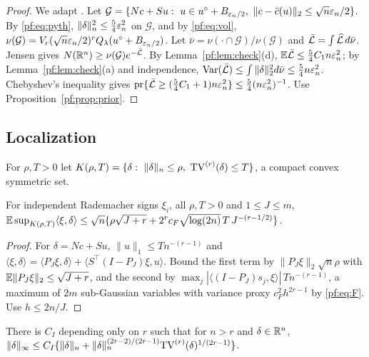 \begin{proof}
We adapt \citet[Lemma~8.1]{ghosal2000convergence}. Let $\mathcal G=\{Nc+Su:\ u\in u^\circ+B_{\en/2},\ \|c-\bar c(u)\|_2\le\sqrt n\en/2\}$. By \eqref{pf:eq:pyth}, $\|\delta\|_n^2\le\tfrac54\varepsilon_n^2$ on $\mathcal G$, and by \eqref{pf:eq:vol}, $\nu(\mathcal G)=V_r(\sqrt n\varepsilon_n/2)^rQ_\lambda(u^\circ+B_{\varepsilon_n/2})$. Let $\bar\nu=\nu(\cdot\cap\mathcal G)/\nu(\mathcal G)$ and $\bar{\mathcal L}=\int\widehat{\mathcal L}\,d\bar\nu$. Jensen gives $N(\mathbb{R}^n)\ge\nu(\mathcal G)e^{-\bar{\mathcal L}}$. By Lemma~\ref{pf:lem:check}(d), $\mathbb{E}\bar{\mathcal L}\le\tfrac54C_1n\varepsilon_n^2$; by Lemma~\ref{pf:lem:check}(a) and independence, $\mathrm{Var}(\bar{\mathcal L})\le\int\|\delta\|_2^2d\bar\nu\le\tfrac54n\varepsilon_n^2$. Chebyshev's inequality gives $\mathrm{pr}\{\bar{\mathcal L}\ge(\tfrac54C_1+1)n\varepsilon_n^2\}\le\tfrac54(n\varepsilon_n^2)^{-1}$. Use Proposition~\ref{pf:prop:prior}.
\end{proof}

\subsection{Localization}

For $\rho,T>0$ let $K(\rho,T)=\{\delta:\ \nn{\delta}\le\rho,\ \TV^{(r)}(\delta)\le T\}$, a compact convex symmetric set.

\begin{lemma}[width]\label{pf:lem:width}
For independent Rademacher signs $\xi_i$, all $\rho,T>0$ and $1\le J\le m$,
$\mathbb{E}\sup_{K(\rho,T)}\langle\xi,\delta\rangle\le\sqrt n\{\rho\sqrt{J+r}+2^rc_F\sqrt{\log(2n)}\,T\,J^{-(r-1/2)}\}$.
\end{lemma}

\begin{proof}
For $\delta=Nc+Su$, $\|u\|_1\le Tn^{-(r-1)}$ and $\langle\xi,\delta\rangle=\langle P_J\xi,\delta\rangle+\langle S^\top(I-P_J)\xi,u\rangle$. Bound the first term by $\|P_J\xi\|_2\sqrt n\rho$ with $\mathbb{E}\|P_J\xi\|_2\le\sqrt{J+r}$, and the second by $\max_j|\langle(I-P_J)s_j,\xi\rangle|\,Tn^{-(r-1)}$, a maximum of $2m$ sub-Gaussian variables with variance proxy $c_F^2h^{2r-1}$ by \eqref{pf:eq:F}. Use $h\le2n/J$.
\end{proof}

\begin{lemma}[interpolation]\label{pf:lem:interp}
There is $C_I$ depending only on $r$ such that for $n>r$ and $\delta\in\mathbb{R}^n$,
$\|\delta\|_\infty\le C_I\{\|\delta\|_n+\|\delta\|_n^{(2r-2)/(2r-1)}\mathrm{TV}^{(r)}(\delta)^{1/(2r-1)}\}$.
\end{lemma}

